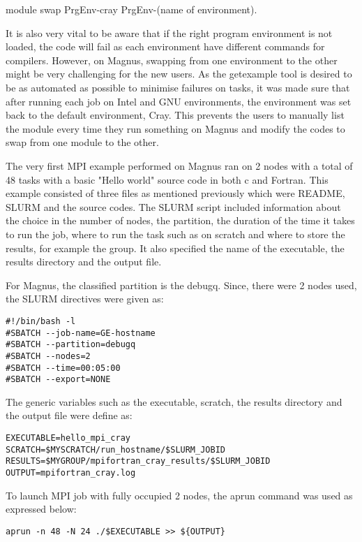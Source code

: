 \documentclass[journal]{IEEEtran}
\begin{document}
\begin{verbatim*}
module swap PrgEnv-cray PrgEnv-(name of environment). 
\end{verbatim*}

It is also very vital to be aware that if the right program environment is not loaded, the code will fail as each environment have different commands 
for compilers. However, on Magnus, swapping from one environment to the other might be very challenging for the new users. As the getexample tool is
desired to be as automated as possible to minimise failures on tasks, it was made sure that after running each job on Intel and GNU environments, the
environment was set back to the default environment, Cray. This prevents the users to manually list the module every time they run something on Magnus
and modify the codes to swap from one module to the other. 

The very first MPI example performed on Magnus ran on 2 nodes with a total of 48 tasks with a basic "Hello world" source code in both c and Fortran. 
This example consisted of three files as mentioned previously which were README, SLURM and the source codes. The SLURM script included information about
the choice in the number of nodes, the partition, the duration of the time it takes to run the job, where to run the task such as on scratch and where
to store the results, for example the group. It also specified the name of the executable, the results directory and the output file. 

For Magnus, the classified partition is the debugq. Since, there were 2 nodes used, the SLURM directives were given as:

\begin{verbatim}
#!/bin/bash -l
#SBATCH --job-name=GE-hostname
#SBATCH --partition=debugq
#SBATCH --nodes=2
#SBATCH --time=00:05:00
#SBATCH --export=NONE
\end{verbatim}

The generic variables such as the executable, scratch, the results directory and the output file were define as:

\begin{verbatim}
EXECUTABLE=hello_mpi_cray
SCRATCH=$MYSCRATCH/run_hostname/$SLURM_JOBID
RESULTS=$MYGROUP/mpifortran_cray_results/$SLURM_JOBID
OUTPUT=mpifortran_cray.log
 \end{verbatim}

To launch MPI job with fully occupied 2 nodes, the aprun command was used as expressed below:

\begin{verbatim}
aprun -n 48 -N 24 ./$EXECUTABLE >> ${OUTPUT}
\end{verbatim}
\end{document}
